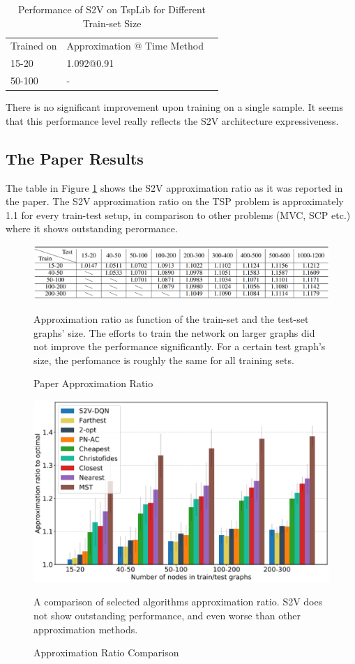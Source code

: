 \documentclass[10pt,a4paper,draft]{article}
\begin{document}
\begin{table}[h] \centering
	\begin{tabular}{lll}
	 	Trained on		& Approximation @ Time Method 	\\
	 	15-20	 		& 1.092@0.91					\\
		50-100			& - 
	\end{tabular}
	\caption{Performance of S2V on TspLib for Different Train-set Size} 
	\label{tb_tsp2d_performance_s2v}
\end{table}

There is no significant improvement upon training on a single sample. It seems that this performance level really reflects the S2V architecture expressiveness.
	
\subsection*{The Paper Results}
	The table in Figure \ref{im_paper_aprx} shows the S2V approximation ratio as it was reported in the paper. The S2V approximation ratio on the TSP problem is approximately 1.1 for every train-test setup, in comparison to other problems (MVC, SCP etc.) where it shows outstanding perormance.
	\begin{figure}[h]
	\centering
	\includegraphics[width=1\textwidth]{tsp_paper_res_table.eps}
	\caption{Paper Approximation Ratio}
	\medskip
	\small
	Approximation ratio as function of the train-set and the test-set graphs' size. The efforts to train the network on larger graphs did not improve the performance significantly. For a certain test graph's size, the perfomance is roughly the same for all training sets. 
	\label{im_paper_aprx}
	\end{figure}
	
	\begin{figure}[h]
	\centering
	\includegraphics[width=1\textwidth]{tsp_paper_res_comp.eps}
	\caption{Approximation Ratio Comparison}
	\medskip
	\small
	A comparison of selected algorithms approximation ratio. S2V does not show outstanding performance, and even worse than other approximation methods.
	\label{im_paper_aprx_comp}
	\end{figure}
	 
\end{document}

